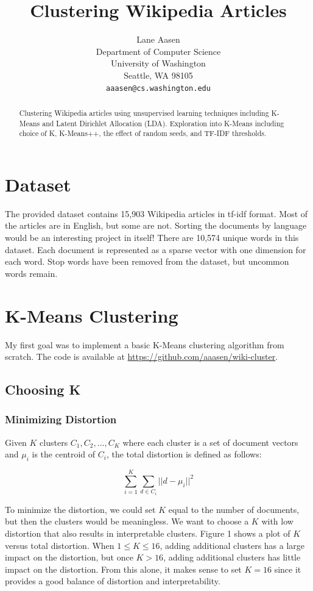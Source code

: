 \documentclass{article} %
\title{Clustering Wikipedia Articles}
\author{
Lane Aasen\\
Department of Computer Science\\
University of Washington\\
Seattle, WA 98105\\
\texttt{aaasen@cs.washington.edu}\\
}
\begin{document}
\maketitle

\begin{abstract}
Clustering Wikipedia articles using unsupervised learning techniques including K-Means and Latent Dirichlet Allocation (LDA). Exploration into K-Means including choice of K, K-Means++, the effect of random seeds, and TF-IDF thresholds.
\end{abstract}


\section{Dataset}

The provided dataset contains 15,903 Wikipedia articles in tf-idf format. Most of the articles are in English, but some are not. Sorting the documents by language would be an interesting project in itself! There are 10,574 unique words in this dataset. Each document is represented as a sparse vector with one dimension for each word. Stop words have been removed from the dataset, but uncommon words remain.

\section{K-Means Clustering}

My first goal was to implement a basic K-Means clustering algorithm from scratch. The code is available at \url{https://github.com/aaasen/wiki-cluster}.

\subsection{Choosing K}

\subsubsection{Minimizing Distortion}

Given $K$ clusters $C_{1},C_{2},...,C_{K}$ where each cluster is a set of document vectors and $\mu_{i}$ is the centroid of $C_{i}$, the total distortion is defined as follows:

$$\sum_{i=1}^{K}\sum_{d \in C_{i}} ||d - \mu_{i}||^{2}$$

To minimize the distortion, we could set $K$ equal to the number of documents, but then the clusters would be meaningless. We want to choose a $K$ with low distortion that also results in interpretable clusters. Figure 1 shows a plot of $K$ versus total distortion. When $1 \leq K \leq 16$, adding additional clusters has a large impact on the distortion, but once $K > 16$, adding additional clusters has little impact on the distortion. From this alone, it makes sense to set $K=16$ since it provides a good balance of distortion and interpretability.
\end{document}
